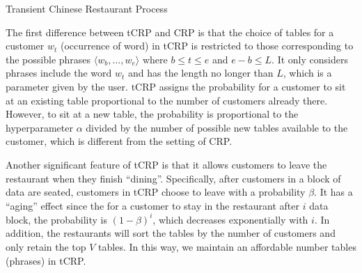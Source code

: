 \begin{algorithm}[h!]
\caption{Transient Chinese Restaurant Process}\label{alg::tcrp}
  \SetAlgoNoLine
\end{algorithm}

The first difference between tCRP and CRP is that the choice of tables for a
customer $w_t$ (occurrence of word) in tCRP is restricted to those corresponding
to the possible phrases $\langle w_b, \dots, w_e \rangle$ where $b \le t \le e$
and $e - b \le L$. It only considers phrases include the word $w_t$ and has the
length no longer than $L$, which is a parameter given by the user.  tCRP assigns
the probability for a customer to sit at an existing table proportional to the
number of customers already there. However, to sit at a new table, the
probability is proportional to the hyperparameter $\alpha$ divided by the number
of possible new tables available to the customer, which is different from the
setting of CRP.

Another significant feature of tCRP is that it allows customers to leave the
restaurant when they finish ``dining''. Specifically, after customers in a block
of data are seated, customers in tCRP choose to leave with a probability
$\beta$. It has a ``aging'' effect since the for a customer to stay in the
restaurant after $i$ data block, the probability is $(1 - \beta)^i$, which
decreases exponentially with $i$. In addition, the restaurants will sort the
tables by the number of customers and only retain the top $V$ tables. In this
way, we maintain an affordable number tables (phrases) in tCRP.

